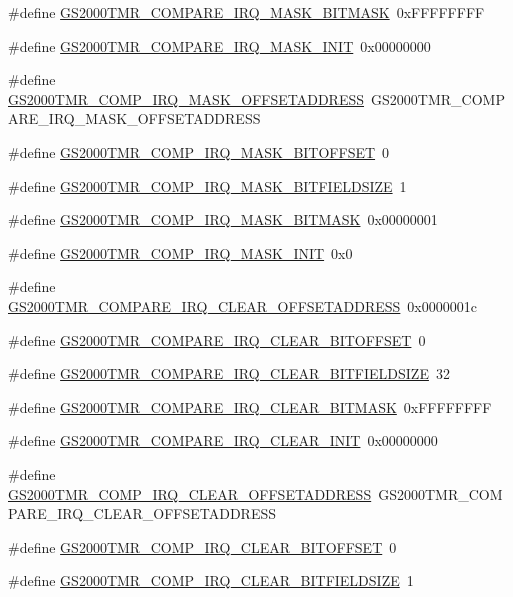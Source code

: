 \begin{DoxyCompactItemize}
\item 
\#define \hyperlink{a00556_a0bfd8f8bf7eed8b86f4ac9f4018bb90b}{GS2000TMR\_\-COMPARE\_\-IRQ\_\-MASK\_\-BITMASK}~0xFFFFFFFF
\item 
\#define \hyperlink{a00556_a5c8e8ad35725f55e87431efaa15c2671}{GS2000TMR\_\-COMPARE\_\-IRQ\_\-MASK\_\-INIT}~0x00000000
\item 
\#define \hyperlink{a00556_a45573c661863df83158f905909efcb7b}{GS2000TMR\_\-COMP\_\-IRQ\_\-MASK\_\-OFFSETADDRESS}~GS2000TMR\_\-COMPARE\_\-IRQ\_\-MASK\_\-OFFSETADDRESS
\item 
\#define \hyperlink{a00556_a9c690311086ad1618c2798134f0c2bce}{GS2000TMR\_\-COMP\_\-IRQ\_\-MASK\_\-BITOFFSET}~0
\item 
\#define \hyperlink{a00556_aa442dbd1010110506680c734a70e15c2}{GS2000TMR\_\-COMP\_\-IRQ\_\-MASK\_\-BITFIELDSIZE}~1
\item 
\#define \hyperlink{a00556_ad7fc9b92f362328e3246cd4164a38dab}{GS2000TMR\_\-COMP\_\-IRQ\_\-MASK\_\-BITMASK}~0x00000001
\item 
\#define \hyperlink{a00556_a92689827d8105456966fcc290b2d67db}{GS2000TMR\_\-COMP\_\-IRQ\_\-MASK\_\-INIT}~0x0
\item 
\#define \hyperlink{a00556_abdef32cdddc8fddeaa2539b055ab69d8}{GS2000TMR\_\-COMPARE\_\-IRQ\_\-CLEAR\_\-OFFSETADDRESS}~0x0000001c
\item 
\#define \hyperlink{a00556_a7e40e690f1201203a1579cc387a95937}{GS2000TMR\_\-COMPARE\_\-IRQ\_\-CLEAR\_\-BITOFFSET}~0
\item 
\#define \hyperlink{a00556_acdf202706ee4c7a39ee177a6dfce2573}{GS2000TMR\_\-COMPARE\_\-IRQ\_\-CLEAR\_\-BITFIELDSIZE}~32
\item 
\#define \hyperlink{a00556_acfdf4abf1ee38c1cfc57e45fba2374fe}{GS2000TMR\_\-COMPARE\_\-IRQ\_\-CLEAR\_\-BITMASK}~0xFFFFFFFF
\item 
\#define \hyperlink{a00556_a1e1b860854deaf81a55c0a0a600fd6bd}{GS2000TMR\_\-COMPARE\_\-IRQ\_\-CLEAR\_\-INIT}~0x00000000
\item 
\#define \hyperlink{a00556_aac6a79617240b1bad42d90118f40e335}{GS2000TMR\_\-COMP\_\-IRQ\_\-CLEAR\_\-OFFSETADDRESS}~GS2000TMR\_\-COMPARE\_\-IRQ\_\-CLEAR\_\-OFFSETADDRESS
\item 
\#define \hyperlink{a00556_a9d0a7088e5d17c41891ed1d89dfedfef}{GS2000TMR\_\-COMP\_\-IRQ\_\-CLEAR\_\-BITOFFSET}~0
\item 
\#define \hyperlink{a00556_a946ce88efcaba01045cf8ac57c8da242}{GS2000TMR\_\-COMP\_\-IRQ\_\-CLEAR\_\-BITFIELDSIZE}~1
\item 

\end{DoxyCompactItemize}
